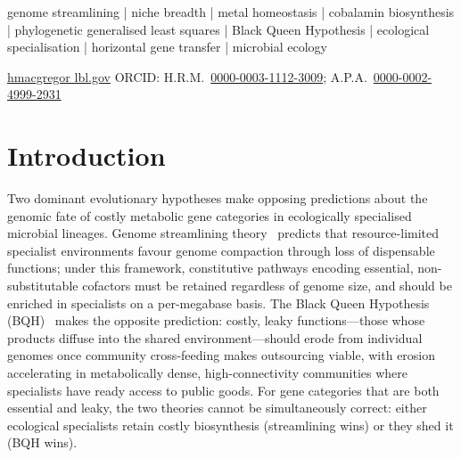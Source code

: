 \documentclass[times]{zHenriquesLab-StyleBioRxiv}
\begin{document}
\begin{keywords}
genome streamlining | niche breadth | metal homeostasis | cobalamin biosynthesis |
phylogenetic generalised least squares | Black Queen Hypothesis | ecological specialisation |
horizontal gene transfer | microbial ecology
\end{keywords}

\begin{corrauthor}
\href{mailto:hmacgregor@lbl.gov}{hmacgregor \at lbl.gov}\quad
ORCID: H.R.M.~\href{https://orcid.org/0000-0003-1112-3009}{0000-0003-1112-3009};\enspace
A.P.A.~\href{https://orcid.org/0000-0002-4999-2931}{0000-0002-4999-2931}
\end{corrauthor}


\section*{Introduction}
\setcounter{section}{1}

Two dominant evolutionary hypotheses make opposing predictions about the
genomic fate of costly metabolic gene categories in ecologically specialised
microbial lineages. Genome streamlining theory~\cite{giovannoni2014} predicts
that resource-limited specialist environments favour genome compaction through
loss of dispensable functions; under this framework, constitutive pathways
encoding essential, non-substitutable cofactors must be retained regardless of
genome size, and should be enriched in specialists on a per-megabase basis.
The Black Queen Hypothesis (BQH)~\cite{morris2012} makes the opposite
prediction: costly, leaky functions---those whose products diffuse into the
shared environment---should erode from individual genomes once community
cross-feeding makes outsourcing viable, with erosion accelerating in
metabolically dense, high-connectivity communities where specialists have
ready access to public goods. For gene categories that are both essential and
leaky, the two theories cannot be simultaneously correct: either ecological
specialists retain costly biosynthesis (streamlining wins) or they shed it
(BQH wins).
\end{document}
